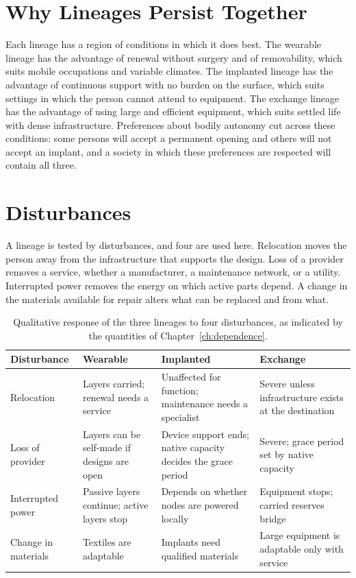 \documentclass[11pt,openany]{book}
\theoremstyle{definition}
\theoremstyle{remark}
\begin{document}
\section{Why Lineages Persist Together}

Each lineage has a region of conditions in which it does best. The wearable lineage has the advantage of renewal without surgery and of removability, which suits mobile occupations and variable climates. The implanted lineage has the advantage of continuous support with no burden on the surface, which suits settings in which the person cannot attend to equipment. The exchange lineage has the advantage of using large and efficient equipment, which suits settled life with dense infrastructure. Preferences about bodily autonomy cut across these conditions: some persons will accept a permanent opening and others will not accept an implant, and a society in which these preferences are respected will contain all three.

\section{Disturbances}

A lineage is tested by disturbances, and four are used here. Relocation moves the person away from the infrastructure that supports the design. Loss of a provider removes a service, whether a manufacturer, a maintenance network, or a utility. Interrupted power removes the energy on which active parts depend. A change in the materials available for repair alters what can be replaced and from what.

\begin{table}[ht]
\centering
\caption{Qualitative response of the three lineages to four disturbances, as indicated by the quantities of Chapter~\ref{ch:dependence}.}
\label{tab:lineages}
\small
\begin{tabular}{@{}p{2.8cm}p{3.1cm}p{3.1cm}p{3.1cm}@{}}
\toprule
Disturbance & Wearable & Implanted & Exchange \\
\midrule
Relocation & Layers carried; renewal needs a service & Unaffected for function; maintenance needs a specialist & Severe unless infrastructure exists at the destination \\
Loss of provider & Layers can be self-made if designs are open & Device support ends; native capacity decides the grace period & Severe; grace period set by native capacity \\
Interrupted power & Passive layers continue; active layers stop & Depends on whether nodes are powered locally & Equipment stops; carried reserves bridge \\
Change in materials & Textiles are adaptable & Implants need qualified materials & Large equipment is adaptable only with service \\
\bottomrule
\end{tabular}
\end{table}
\end{document}
